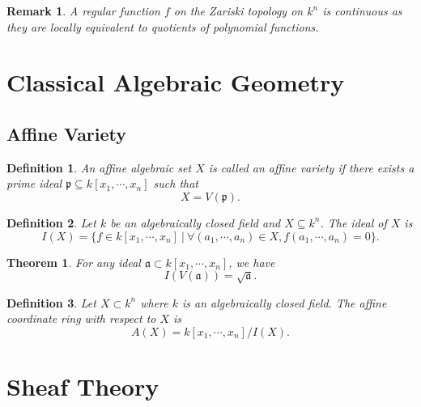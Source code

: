 \documentclass{article}
\newtheorem{theorem}{Theorem}[section]
\newtheorem{definition}{Definition}[section]
\newtheorem{remark}{Remark}[section]
\numberwithin{equation}{section}
\begin{document}
\begin{remark}
A regular function $f$ on the Zariski topology on $k^n$ is continuous as they are locally equivalent to quotients of polynomial functions.
\label{reg_cont_inc}
\end{remark}

\section{Classical Algebraic Geometry}

\subsection{Affine Variety}

\begin{definition}
An affine algebraic set $X$ is called an affine variety if there exists a prime ideal $\mathfrak{p}\subseteq k[x_1,\cdots,x_n]$ such that
\begin{equation*}
X=V(\mathfrak{p}).
\end{equation*}
\end{definition}

\begin{definition}
Let $k$ be an algebraically closed field and $X\subseteq k^n$. The ideal of $X$ is 
\begin{equation*}
I(X)=\{f\in k[x_1,\cdots,x_n]\:|\: \forall (a_1,\cdots,a_n)\in X, f(a_1,\cdots,a_n) = 0\}.
\end{equation*}
\end{definition}

\begin{theorem}
For any ideal $\mathfrak{a}\subset k[x_1,\cdots,x_n]$, we have
\begin{equation*}
I(V(\mathfrak{a})) = \sqrt{\mathfrak{a}}.
\end{equation*}
\end{theorem}

\begin{definition}
Let $X\subset k^n$ where $k$ is an algebraically closed field. The affine coordinate ring with respect to $X$ is 
\begin{equation*}
A(X)=k[x_1,\cdots,x_n]/I(X).
\end{equation*}
\end{definition}

\section{Sheaf Theory}
\end{document}
